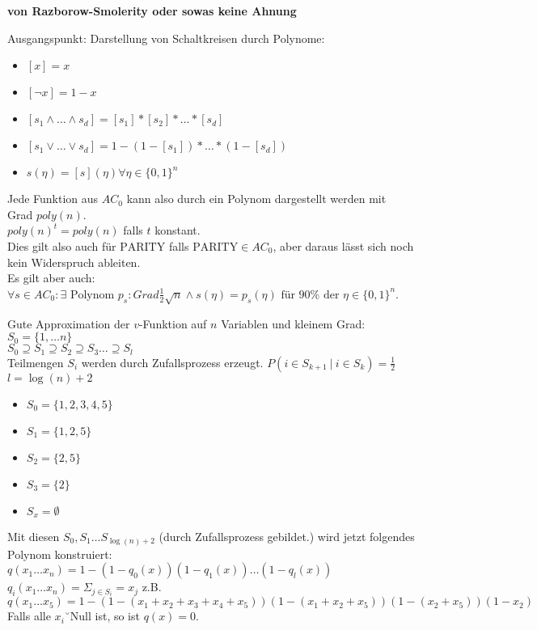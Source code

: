 \begin{beweis}
    \textbf{von Razborow-Smolerity oder sowas keine Ahnung}

    Ausgangspunkt:
    Darstellung von Schaltkreisen durch Polynome:
    \begin{itemize}
        \item $[x] = x$
        \item $[\neg x] = 1 - x$
        \item $[s_1 \land \dots \land s_d] = [s_1] * [s_2] * \dots * [s_d]$
        \item $[s_1 \lor \dots \lor s_d] = 1 - (1 - [s_1]) * \dots * (1 - [s_d])$
        \item $s(\eta) = [s](\eta) \forall \eta \in \{0,1\}^n$
    \end{itemize}
    Jede Funktion aus $AC_0$ kann also durch ein Polynom dargestellt werden mit
    Grad $poly(n)$.
    \\
    $poly(n)^t = poly(n)$ falls $t$ konstant.
    \\
    Dies gilt also auch für $\text{PARITY}$ falls $\text{PARITY} \in AC_0$, aber
    daraus lässt sich noch kein Widerspruch ableiten.
    \\
    Es gilt aber auch: $\forall s \in AC_0: \exists \text{ Polynom } p_s: Grad
    \frac{1}{2}\sqrt{n} \land s(\eta) = p_s(\eta) \text{ für } 90\% \text{ der }
    \eta \in \{0,1\}^n$.

    Gute Approximation der $v$-Funktion auf $n$ Variablen und kleinem Grad:
    $S_0 = \{1, \dots n\}$
    \\
    $S_0 \supseteq S_1 \supseteq  S_2 \supseteq  S_3 \dots \supseteq S_l  $
    \\
    Teilmengen $S_i$ werden durch Zufallsprozess erzeugt.
    $P(i \in S_{k+1} \ |\ i \in S_k) = \frac{1}{2}$
    \\
    $l = \log(n) + 2$
    \begin{itemize}
        \item $S_0 = \{1, 2, 3, 4, 5\}$
        \item $S_1 = \{1, 2, 5\}$
        \item $S_2 = \{2, 5\}$
        \item $S_3 = \{2\}$
        \item $S_x = \emptyset$
    \end{itemize}
    Mit diesen $S_0, S_1 \dots S_{\log(n)+2}$ (durch Zufallsprozess gebildet.)
    wird jetzt folgendes Polynom konstruiert:
    $q(x_1 \dots x_n) = 1 - (1 - q_0(x)) (1 - q_1(x)) \dots (1 - q_l(x))$
    \\
    $q_i(x_1 \dots x_n) = \Sigma_{j \in S_i} = x_j$
    z.B. $q(x_1 \dots x_5) = 1 - (1 - (x_1 + x_2 + x_3 + x_4 + x_5)) (1 - (x_1 +
    x_2 + x_5)) (1 - (x_2 + x_5)) (1 - x_2)$
    \\
    Falls alle $x_i$˘Null ist, so ist $q(x) = 0$.


\end{beweis}
